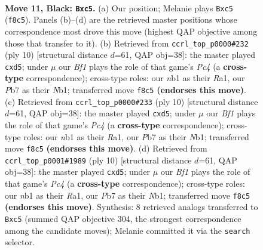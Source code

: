 \documentclass[11pt]{article}
\begin{document}
\clearpage

\begin{figure}[p]\centering
\begin{subfigure}{0.46\textwidth}\centering
\resizebox{\linewidth}{!}{%
\newchessgame
\chessboard[
  setfen={rn2kbnr/1p3ppp/pq6/2PpP2b/7P/1P2BN2/P3BPP1/RN1QK2R b KQkq - 0 11},
  showmover=false,
  pgfstyle=straightmove, color=movearrow, markmove={f8-c5}
]}
\caption{}
\end{subfigure}\hfill
\begin{subfigure}{0.46\textwidth}\centering
\resizebox{\linewidth}{!}{%
\newchessgame
\chessboard[
  setfen={rnbqkb1r/pp3ppp/2p2n2/3p4/2PQ4/6P1/PP2PPBP/RNB1K1NR w KQkq - 0 6},
  showmover=false,
  pgfstyle=straightmove, color=movearrow, markmove={c4-d5}
]}
\caption{}
\end{subfigure}
\\[4pt]
\begin{subfigure}{0.46\textwidth}\centering
\resizebox{\linewidth}{!}{%
\newchessgame
\chessboard[
  setfen={rnbqkb1r/pp3ppp/2p2n2/3p4/2PQ4/6P1/PP2PPBP/RNB1K1NR w KQkq - 0 6},
  showmover=false,
  pgfstyle=straightmove, color=movearrow, markmove={c4-d5}
]}
\caption{}
\end{subfigure}\hfill
\begin{subfigure}{0.46\textwidth}\centering
\resizebox{\linewidth}{!}{%
\newchessgame
\chessboard[
  setfen={rnbqkb1r/pp3ppp/2p2n2/3p4/2PQ4/6P1/PP2PPBP/RNB1K1NR w KQkq - 0 6},
  showmover=false,
  pgfstyle=straightmove, color=movearrow, markmove={c4-d5}
]}
\caption{}
\end{subfigure}
\caption{\textbf{Move 11, Black: \texttt{Bxc5}.} (a) Our position; Melanie plays \texttt{Bxc5} (\texttt{f8c5}). Panels (b)--(d) are the retrieved master positions whose correspondence most drove this move (highest QAP objective among those that transfer to it). (b) Retrieved from \texttt{ccrl\_top\_p0000\#232} (ply 10) [structural distance $d$=61, QAP obj=38]: the master played \texttt{cxd5}; under $\mu$ our \emph{Bf1} plays the role of that game's \emph{Pc4} (a \textbf{cross-type} correspondence); cross-type roles: our \emph{n}b1 as their \emph{R}a1, our \emph{P}b7 as their \emph{N}b1; transferred move \texttt{f8c5} \textbf{(endorses this move)}. (c) Retrieved from \texttt{ccrl\_top\_p0000\#233} (ply 10) [structural distance $d$=61, QAP obj=38]: the master played \texttt{cxd5}; under $\mu$ our \emph{Bf1} plays the role of that game's \emph{Pc4} (a \textbf{cross-type} correspondence); cross-type roles: our \emph{n}b1 as their \emph{R}a1, our \emph{P}b7 as their \emph{N}b1; transferred move \texttt{f8c5} \textbf{(endorses this move)}. (d) Retrieved from \texttt{ccrl\_top\_p0001\#1989} (ply 10) [structural distance $d$=61, QAP obj=38]: the master played \texttt{cxd5}; under $\mu$ our \emph{Bf1} plays the role of that game's \emph{Pc4} (a \textbf{cross-type} correspondence); cross-type roles: our \emph{n}b1 as their \emph{R}a1, our \emph{P}b7 as their \emph{N}b1; transferred move \texttt{f8c5} \textbf{(endorses this move)}. Synthesis: 8 retrieved analogs transferred to \texttt{Bxc5} (summed QAP objective 304, the strongest correspondence among the candidate moves); Melanie committed it via the \texttt{search} selector.}
\label{fig:thought-m21}
\end{figure}
\end{document}
